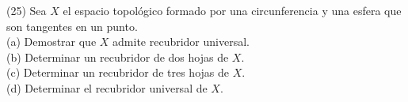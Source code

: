 \documentclass[
  a4paper,
  spanish,
  12pt,
]{scrartcl}
\begin{document}
\begin{ejer}
(25) Sea $X$ el espacio topológico formado por una circunferencia y una esfera que son tangentes en un punto.\\
(a) Demostrar que $X$ admite recubridor universal.\\
(b) Determinar un recubridor de dos hojas de $X$.\\
(c) Determinar un recubridor de tres hojas de $X$.\\
(d) Determinar el recubridor universal de $X$.
\end{ejer}
\end{document}
